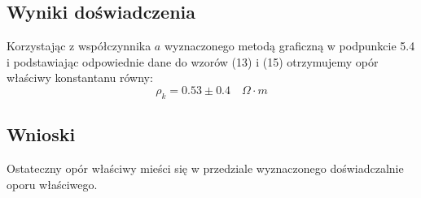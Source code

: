 \documentclass{article} %
\begin{document}
\subsection{Wyniki doświadczenia}

Korzystając z współczynnika $a$ wyznaczonego metodą graficzną w podpunkcie 5.4 i podstawiając odpowiednie dane do wzorów (13) i (15) otrzymujemy opór właściwy konstantanu równy:
{\large
\begin{equation}
    \rho_k =  0.53 \pm 0.4 \quad\Omega \cdot m
\end{equation}
}
\subsection{Wnioski}
Ostateczny opór właściwy mieści się w przedziale wyznaczonego doświadczalnie oporu właściwego.
\end{document}
